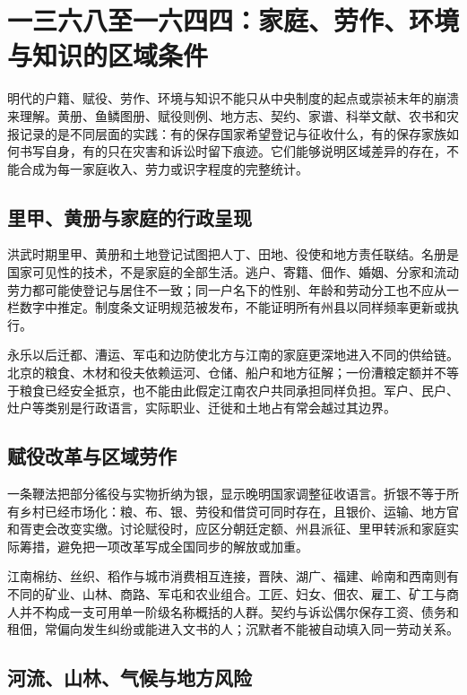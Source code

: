 \section{一三六八至一六四四：家庭、劳作、环境与知识的区域条件}
\label{sec:ming-households-labor-environment-knowledge}

明代的户籍、赋役、劳作、环境与知识不能只从中央制度的起点或崇祯末年的崩溃来理解。黄册、鱼鳞图册、赋役则例、地方志、契约、家谱、科举文献、农书和灾报记录的是不同层面的实践：有的保存国家希望登记与征收什么，有的保存家族如何书写自身，有的只在灾害和诉讼时留下痕迹。它们能够说明区域差异的存在，不能合成为每一家庭收入、劳力或识字程度的完整统计。

\subsection{里甲、黄册与家庭的行政呈现}

洪武时期里甲、黄册和土地登记试图把人丁、田地、役使和地方责任联结。名册是国家可见性的技术，不是家庭的全部生活。逃户、寄籍、佃作、婚姻、分家和流动劳力都可能使登记与居住不一致；同一户名下的性别、年龄和劳动分工也不应从一栏数字中推定。制度条文证明规范被发布，不能证明所有州县以同样频率更新或执行。

永乐以后迁都、漕运、军屯和边防使北方与江南的家庭更深地进入不同的供给链。北京的粮食、木材和役夫依赖运河、仓储、船户和地方征解；一份漕粮定额并不等于粮食已经安全抵京，也不能由此假定江南农户共同承担同样负担。军户、民户、灶户等类别是行政语言，实际职业、迁徙和土地占有常会越过其边界。

\subsection{赋役改革与区域劳作}

一条鞭法把部分徭役与实物折纳为银，显示晚明国家调整征收语言。折银不等于所有乡村已经市场化：粮、布、银、劳役和借贷可同时存在，且银价、运输、地方官和胥吏会改变实缴。讨论赋役时，应区分朝廷定额、州县派征、里甲转派和家庭实际筹措，避免把一项改革写成全国同步的解放或加重。

江南棉纺、丝织、稻作与城市消费相互连接，晋陕、湖广、福建、岭南和西南则有不同的矿业、山林、商路、军屯和农业组合。工匠、妇女、佃农、雇工、矿工与商人并不构成一支可用单一阶级名称概括的人群。契约与诉讼偶尔保存工资、债务和租佃，常偏向发生纠纷或能进入文书的人；沉默者不能被自动填入同一劳动关系。

\subsection{河流、山林、气候与地方风险}

